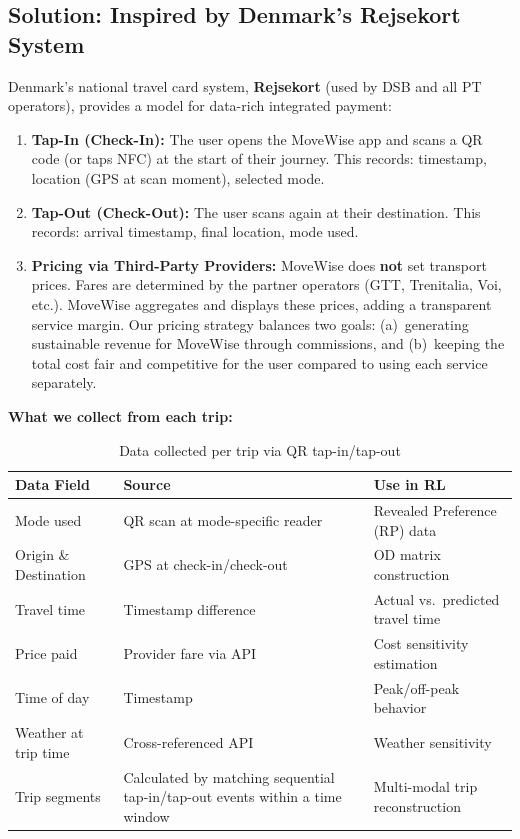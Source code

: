 \documentclass[11pt,a4paper]{article}
\begin{document}
\subsection{Solution: Inspired by Denmark's Rejsekort System}

Denmark's national travel card system, \textbf{Rejsekort} (used by DSB and all PT operators), provides a model for data-rich integrated payment:

\begin{enumerate}[noitemsep]
    \item \textbf{Tap-In (Check-In):} The user opens the MoveWise app and scans a QR code (or taps NFC) at the start of their journey. This records: timestamp, location (GPS at scan moment), selected mode.
    \item \textbf{Tap-Out (Check-Out):} The user scans again at their destination. This records: arrival timestamp, final location, mode used.
    \item \textbf{Pricing via Third-Party Providers:} MoveWise does \textbf{not} set transport prices. Fares are determined by the partner operators (GTT, Trenitalia, Voi, etc.). MoveWise aggregates and displays these prices, adding a transparent service margin. Our pricing strategy balances two goals: (a)~generating sustainable revenue for MoveWise through commissions, and (b)~keeping the total cost fair and competitive for the user compared to using each service separately.
\end{enumerate}

\textbf{What we collect from each trip:}
\begin{table}[H]
\centering
\caption{Data collected per trip via QR tap-in/tap-out}
\begin{tabular}{@{}lll@{}}
\toprule
\textbf{Data Field} & \textbf{Source} & \textbf{Use in RL} \\
\midrule
Mode used & QR scan at mode-specific reader & Revealed Preference (RP) data \\
Origin \& Destination & GPS at check-in/check-out & OD matrix construction \\
Travel time & Timestamp difference & Actual vs.\ predicted travel time \\
Price paid & Provider fare via API & Cost sensitivity estimation \\
Time of day & Timestamp & Peak/off-peak behavior \\
Weather at trip time & Cross-referenced API & Weather sensitivity \\
Trip segments & Calculated by matching sequential tap-in/tap-out events within a time window & Multi-modal trip reconstruction \\
\bottomrule
\end{tabular}
\end{table}
\end{document}
